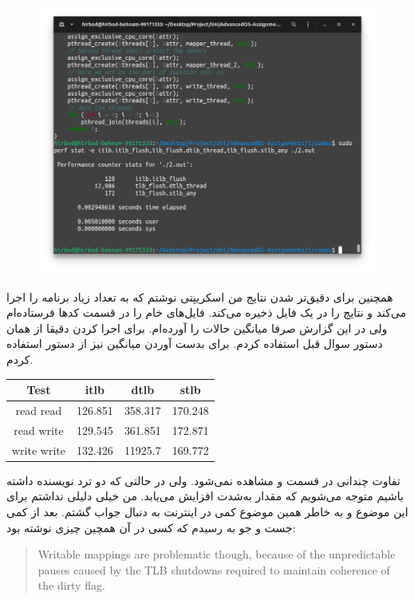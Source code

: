 \begin{figure}[H]
    \centering
    \includegraphics[scale=0.4]{pics/2-write-write.png}
\end{figure}
همچنین برای دقیق‌تر شدن نتایج من اسکریپتی نوشتم که به تعداد زیاد برنامه را اجرا می‌کند و نتایج را در
یک فایل
ذخیره می‌کند. فایل‌های خام
را در قسمت کد‌ها فرستاده‌ام ولی در این گزارش صرفا میانگین حالات را آورده‌ام.
برای اجرا کردن 
دقیقا از همان دستور سوال قبل استفاده کردم.
برای بدست آوردن میانگین نیز از دستور
استفاده کردم.
\begin{latin}
    \centering
    \begin{tabular}{cccc}
    \hline
    Test & itlb & dtlb & stlb\\
    \hline
    read read & 126.851 & 358.317 & 170.248 \\
    \hline
    read write & 129.545 & 361.851 & 172.871 \\
    \hline
    write write & 132.426 & 11925.7 & 169.772 \\
    \hline
    \end{tabular}
\end{latin}
تفاوت چندانی در قسمت
 و 
مشاهده نمی‌شود. ولی در حالتی که دو ترد نویسنده داشته باشیم متوجه می‌شویم که مقدار
به‌شدت افزایش می‌یابد. من خیلی دلیلی نداشتم برای این موضوع و به خاطر همین موضوع کمی در اینترنت به دنبال جواب گشتم.
بعد از کمی جست و جو به
رسیدم که کسی در آن همچین چیزی نوشته بود:
\begin{latin}
\begin{quote}
    Writable mappings are problematic though, because of the unpredictable pauses caused by the TLB shutdowns required to maintain coherence of the dirty flag. 
\end{quote}
\end{latin}
